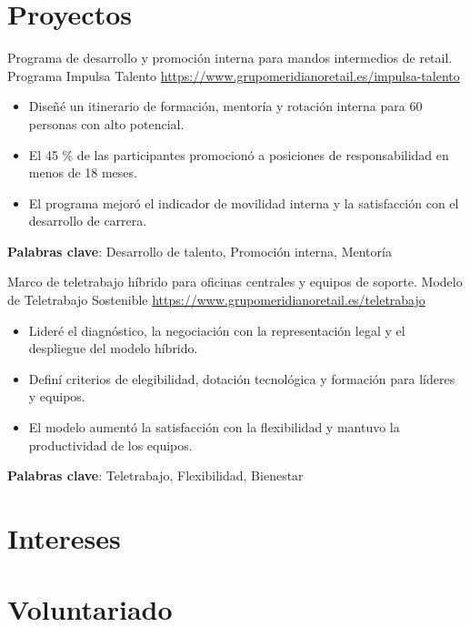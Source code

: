 \documentclass[a4paper, serif, 10pt]{moderncv}
\begin{document}
\section{Proyectos}

        {Programa de desarrollo y promoción interna para mandos intermedios de retail.}
        {Programa Impulsa Talento}
        {\url{https://www.grupomeridianoretail.es/impulsa-talento}}
        {}
        {\begin{itemize}
\item Diseñé un itinerario de formación, mentoría y rotación interna para 60 personas con alto potencial.
\item El 45 \% de las participantes promocionó a posiciones de responsabilidad en menos de 18 meses.
\item El programa mejoró el indicador de movilidad interna y la satisfacción con el desarrollo de carrera.
\end{itemize}
\textbf{Palabras clave}: Desarrollo de talento, Promoción interna, Mentoría}

        {Marco de teletrabajo híbrido para oficinas centrales y equipos de soporte.}
        {Modelo de Teletrabajo Sostenible}
        {\url{https://www.grupomeridianoretail.es/teletrabajo}}
        {}
        {\begin{itemize}
\item Lideré el diagnóstico, la negociación con la representación legal y el despliegue del modelo híbrido.
\item Definí criterios de elegibilidad, dotación tecnológica y formación para líderes y equipos.
\item El modelo aumentó la satisfacción con la flexibilidad y mantuvo la productividad de los equipos.
\end{itemize}
\textbf{Palabras clave}: Teletrabajo, Flexibilidad, Bienestar}
\section{Intereses}

\section{Voluntariado}
\end{document}
